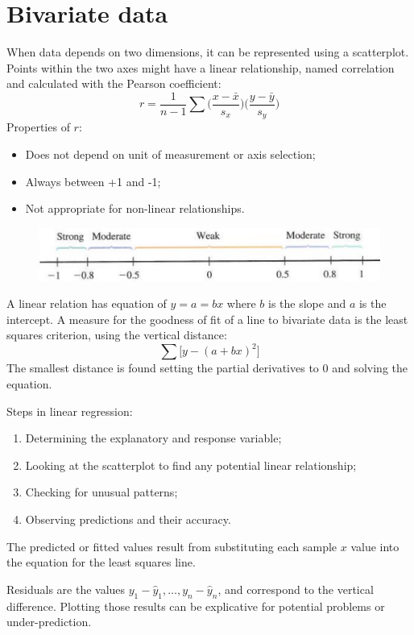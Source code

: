 \section{Bivariate data}
When data depends on two dimensions, it can be represented using a scatterplot. Points within the two axes might have a linear relationship, named correlation and calculated with the Pearson coefficient:
$$r = \frac{1}{n-1} \sum \Big( \frac{x - \bar{x}}{s_x} \Big) \Big( \frac{y - \bar{y}}{s_y} \Big)$$
Properties of $r$:
\begin{itemize}
	\item Does not depend on unit of measurement or axis selection;
	\item Always between +1 and -1;
	\item Not appropriate for non-linear relationships.
\end{itemize}
\begin{figure}[h]
	\centering
	\includegraphics[scale=0.5]{lectures/images/r.png}
\end{figure}
A linear relation has equation of $y = a = bx$ where $b$ is the slope and $a$ is the intercept. A measure for the goodness of fit of a line to bivariate data is the least squares criterion, using the vertical distance:
$$\sum \big[ y - (a + bx)^2 \big]$$
The smallest distance is found setting the partial derivatives to 0 and solving the equation.

Steps in linear regression:
\begin{enumerate}
	\item Determining the explanatory and response variable;
	\item Looking at the scatterplot to find any potential linear relationship;
	\item Checking for unusual patterns;
	\item Observing predictions and their accuracy.
\end{enumerate}
The predicted or fitted values result from substituting each sample $x$ value into the equation for the least squares line.

Residuals are the values $y_1 - \hat{y}_1, \dots, y_n - \hat{y}_n$, and correspond to the vertical difference. Plotting those results can be explicative for potential problems or under-prediction.

